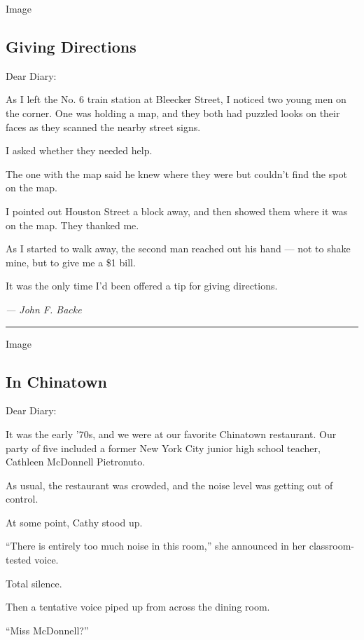Image

\hypertarget{giving-directions}{%
\subsection{Giving Directions}\label{giving-directions}}

Dear Diary:

As I left the No. 6 train station at Bleecker Street, I noticed two
young men on the corner. One was holding a map, and they both had
puzzled looks on their faces as they scanned the nearby street signs.

I asked whether they needed help.

The one with the map said he knew where they were but couldn't find the
spot on the map.

I pointed out Houston Street a block away, and then showed them where it
was on the map. They thanked me.

As I started to walk away, the second man reached out his hand --- not
to shake mine, but to give me a \$1 bill.

It was the only time I'd been offered a tip for giving directions.

\emph{--- John F. Backe}

\begin{center}\rule{0.5\linewidth}{\linethickness}\end{center}

Image

\hypertarget{in-chinatown}{%
\subsection{In Chinatown}\label{in-chinatown}}

Dear Diary:

It was the early '70s, and we were at our favorite Chinatown restaurant.
Our party of five included a former New York City junior high school
teacher, Cathleen McDonnell Pietronuto.

As usual, the restaurant was crowded, and the noise level was getting
out of control.

At some point, Cathy stood up.

``There is entirely too much noise in this room,'' she announced in her
classroom-tested voice.

Total silence.

Then a tentative voice piped up from across the dining room.

``Miss McDonnell?''

